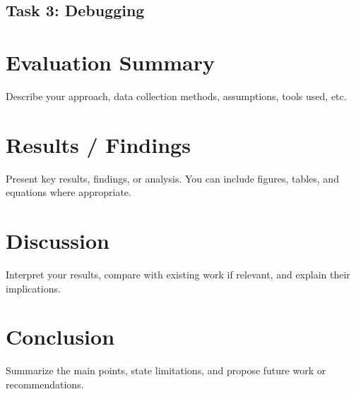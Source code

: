 \documentclass[10pt]{article}
\begin{document}
\subsection{Task 3: Debugging}




\section{Evaluation Summary}
Describe your approach, data collection methods, assumptions, tools used, etc.

\section{Results / Findings}
Present key results, findings, or analysis. You can include figures, tables, and equations where appropriate.

\section{Discussion}
Interpret your results, compare with existing work if relevant, and explain their implications.

\section{Conclusion}
Summarize the main points, state limitations, and propose future work or recommendations.


\end{document}
